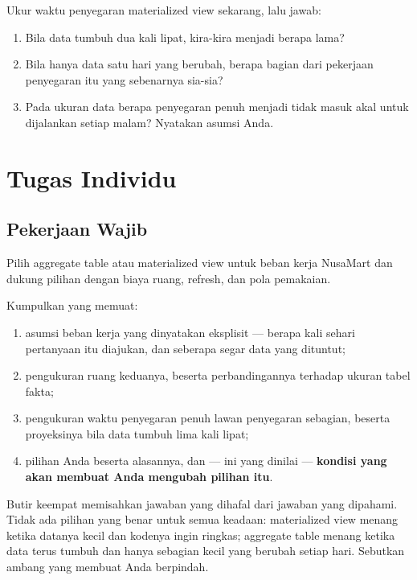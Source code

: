 Ukur waktu penyegaran materialized view sekarang, lalu jawab:

\begin{enumerate}[leftmargin=1.4em]
  \item Bila data tumbuh dua kali lipat, kira-kira menjadi berapa lama?
  \item Bila hanya data satu hari yang berubah, berapa bagian dari pekerjaan
        penyegaran itu yang sebenarnya sia-sia?
  \item Pada ukuran data berapa penyegaran penuh menjadi tidak masuk akal
        untuk dijalankan setiap malam? Nyatakan asumsi Anda.
\end{enumerate}

\section{Tugas Individu}

\subsection{Pekerjaan Wajib}
Pilih aggregate table atau materialized view untuk beban kerja NusaMart dan
dukung pilihan dengan biaya ruang, refresh, dan pola pemakaian.

Kumpulkan  yang memuat:

\begin{enumerate}[leftmargin=1.4em]
  \item asumsi beban kerja yang dinyatakan eksplisit --- berapa kali sehari
        pertanyaan itu diajukan, dan seberapa segar data yang dituntut;
  \item pengukuran ruang keduanya, beserta perbandingannya terhadap ukuran
        tabel fakta;
  \item pengukuran waktu penyegaran penuh lawan penyegaran sebagian, beserta
        proyeksinya bila data tumbuh lima kali lipat;
  \item pilihan Anda beserta alasannya, dan --- ini yang dinilai ---
        \textbf{kondisi yang akan membuat Anda mengubah pilihan itu}.
\end{enumerate}

\begin{catatan}
Butir keempat memisahkan jawaban yang dihafal dari jawaban yang dipahami.
Tidak ada pilihan yang benar untuk semua keadaan: materialized view menang
ketika datanya kecil dan kodenya ingin ringkas; aggregate table menang ketika
data terus tumbuh dan hanya sebagian kecil yang berubah setiap hari.
Sebutkan ambang yang membuat Anda berpindah.
\end{catatan}

